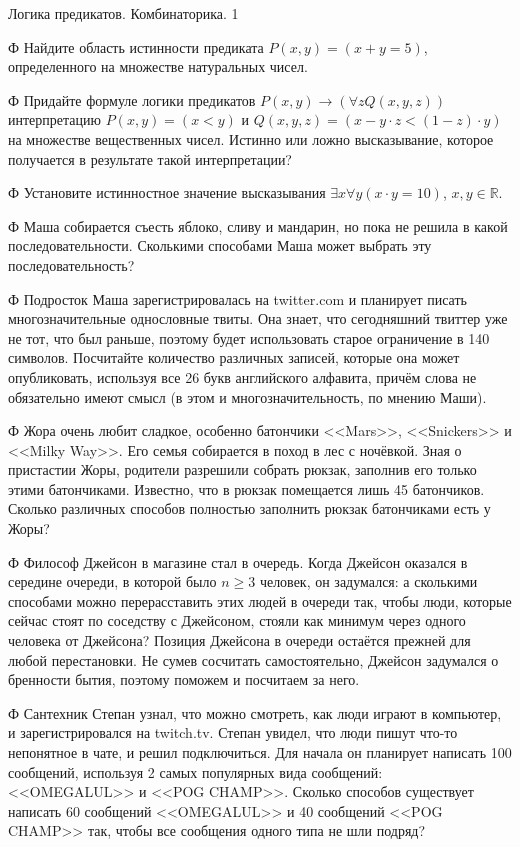 



{Логика предикатов. Комбинаторика.}
{1}

\begin{problemList}

\problemItemSimple
{Ф}
{Найдите область истинности предиката $P(x, y) = (x + y = 5)$, определенного на множестве натуральных чисел.}

\problemItemSimple
{Ф}
{Придайте формуле логики предикатов $P(x, y) \to (\forall{ z Q(x, y, z)})$ интерпретацию $P(x, y) = (x < y)$ и $Q(x, y, z) = (x - y \cdot z < (1 - z) \cdot y)$ на множестве вещественных чисел.
Истинно или ложно высказывание, которое получается в результате такой интерпретации?}

\problemItemSimple
{Ф}
{Установите истинностное значение высказывания $\exists{x \forall{y {(x \cdot y = 10)}}}$, $x, y \in \mathbb{R}$.}

\problemItemSimple
{Ф}
{Маша собирается съесть яблоко, сливу и мандарин, но пока не решила в какой последовательности.
Сколькими способами Маша может выбрать эту последовательность?}

\problemItemSimple
{Ф}
{Подросток Маша зарегистрировалась на twitter.com и планирует писать многозначительные однословные твиты.
Она знает, что сегодняшний твиттер уже не тот, что был раньше, поэтому будет использовать старое ограничение в 140 символов.
Посчитайте количество различных записей, которые она может опубликовать, используя все 26 букв английского алфавита,
причём слова не обязательно имеют смысл (в этом и многозначительность, по мнению Маши).}

\problemItemSimple
{Ф}
{Жора очень любит сладкое, особенно батончики <<Mars>>, <<Snickers>> и <<Milky Way>>.
Его семья собирается в поход в лес с ночёвкой.
Зная о пристастии Жоры, родители разрешили собрать рюкзак, заполнив его только этими батончиками.
Известно, что в рюкзак помещается лишь 45 батончиков.
Сколько различных способов полностью заполнить рюкзак батончиками есть у Жоры?}

\problemItemSimple
{Ф}
{Философ Джейсон в магазине стал в очередь.
Когда Джейсон оказался в середине очереди, в которой было $n \geq 3$ человек, он задумался: а сколькими способами можно перерасставить этих людей в очереди так,
чтобы люди, которые сейчас стоят по соседству с Джейсоном, стояли как минимум через одного человека от Джейсона?
Позиция Джейсона в очереди остаётся прежней для любой перестановки.
Не сумев сосчитать самостоятельно, Джейсон задумался о бренности бытия, поэтому поможем и посчитаем за него.}

\problemItemSimple
{Ф}
{Сантехник Степан узнал, что можно смотреть, как люди играют в компьютер, и зарегистрировался на twitch.tv.
Степан увидел, что люди пишут что-то непонятное в чате, и решил подключиться.
Для начала он планирует написать 100 сообщений, используя 2 самых популярных вида сообщений: <<OMEGALUL>> и <<POG CHAMP>>.
Сколько способов существует написать 60 сообщений <<OMEGALUL>> и 40 сообщений <<POG CHAMP>> так, чтобы все сообщения одного типа не шли подряд?}

\end{problemList}

